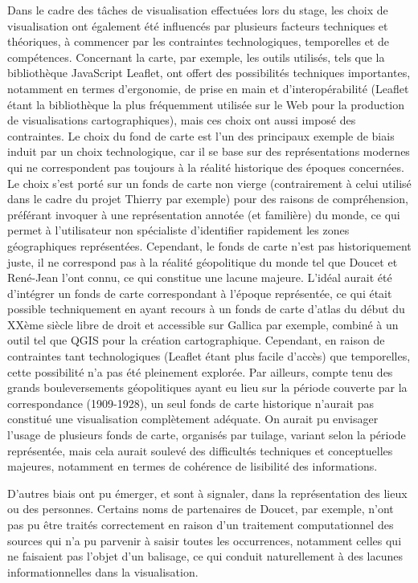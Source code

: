 Dans le cadre des tâches de visualisation effectuées lors du stage, les choix de visualisation ont également été influencés par plusieurs facteurs techniques et théoriques, à commencer par les contraintes technologiques, temporelles et de compétences. 
Concernant la carte, par exemple, les outils utilisés, tels que la bibliothèque JavaScript Leaflet, ont offert des possibilités techniques importantes, notamment en termes d’ergonomie, de prise en main et d’interopérabilité (Leaflet étant la bibliothèque la plus fréquemment utilisée sur le Web pour la production de visualisations cartographiques), mais ces choix ont aussi imposé des contraintes. Le choix du fond de carte est l’un des principaux exemple de biais induit par un choix technologique, car il se base sur des représentations modernes qui ne correspondent pas toujours à la réalité historique des époques concernées. Le choix s’est porté sur un fonds de carte non vierge (contrairement à celui utilisé dans le cadre du projet Thierry par exemple) pour des raisons de compréhension, préférant invoquer à une représentation annotée (et familière) du monde, ce qui permet à l’utilisateur non spécialiste d’identifier rapidement les zones géographiques représentées. Cependant, le fonds de carte n’est pas historiquement juste, il ne correspond pas à la réalité géopolitique du monde tel que Doucet et René-Jean l’ont connu, ce qui constitue une lacune majeure.  L’idéal aurait été d’intégrer un fonds de carte correspondant à l’époque représentée, ce qui était possible techniquement en ayant recours à un fonds de carte d’atlas du début du XXème siècle libre de droit et accessible sur Gallica par exemple, combiné à un outil tel que QGIS pour la création cartographique. Cependant, en raison de contraintes tant technologiques (Leaflet étant plus facile d’accès) que temporelles, cette possibilité n’a pas été pleinement explorée. 
Par ailleurs, compte tenu des grands bouleversements géopolitiques ayant eu lieu sur la période couverte par la correspondance (1909-1928), un seul fonds de carte historique n’aurait pas constitué une visualisation complètement adéquate. On aurait pu envisager l’usage de plusieurs fonds de carte, organisés par tuilage, variant selon la période représentée, mais cela aurait soulevé des difficultés techniques et conceptuelles majeures, notamment en termes de cohérence de lisibilité des informations. 

D’autres biais ont pu émerger, et sont à signaler, dans la représentation des lieux ou des personnes. Certains noms de partenaires de Doucet, par exemple, n’ont pas pu être traités correctement en raison d’un traitement computationnel des sources qui n’a pu parvenir à saisir toutes les occurrences, notamment celles qui ne faisaient pas l’objet d’un balisage, ce qui conduit naturellement à des lacunes informationnelles dans la visualisation. 

